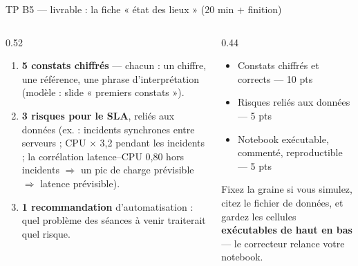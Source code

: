 \begin{frame}{TP B5 --- livrable : la fiche « état des lieux » (20 min + finition)}
\begin{columns}[t]
\begin{column}{0.52\textwidth}
\begin{abox}
\begin{enumerate}
\item \textbf{5 constats chiffrés} --- chacun : un chiffre, une référence,
une phrase d'interprétation (modèle : slide « premiers constats »).
\item \textbf{3 risques pour le SLA}, reliés aux données
(ex. : incidents synchrones entre serveurs ; CPU $\times$ 3,2 pendant
les incidents ; la corrélation latence--CPU 0,80 hors incidents
$\Rightarrow$ un pic de charge prévisible $\Rightarrow$ latence prévisible).
\item \textbf{1 recommandation} d'automatisation : quel problème des
séances à venir traiterait quel risque.
\end{enumerate}
\end{abox}
\end{column}
\begin{column}{0.44\textwidth}
\begin{kbox}
\begin{itemize}
\item Constats chiffrés et corrects --- 10 pts
\item Risques reliés aux données --- 5 pts
\item Notebook exécutable, commenté, reproductible --- 5 pts
\end{itemize}
\end{kbox}
\begin{wbox}
Fixez la graine si vous simulez, citez le fichier de données,
et gardez les cellules \textbf{exécutables de haut en bas}
--- le correcteur relance votre notebook.
\end{wbox}
\end{column}
\end{columns}
\end{frame}

